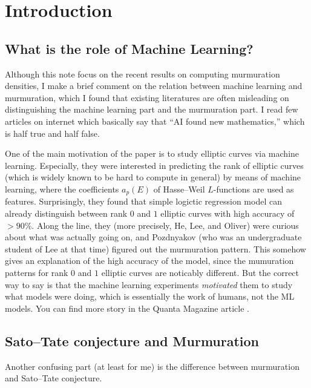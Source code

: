 \section{Introduction}
\label{sec:intro}

\subsection{What is the role of Machine Learning?}

Although this note focus on the recent results on computing murmuration densities, I make a brief comment on the relation between machine learning and murmuration, which I found that existing literatures are often misleading on distinguishing the machine learning part and the murmuration part.
I read few articles on internet which basically say that ``AI found new mathematics,'' which is half true and half false.

One of the main motivation of the paper \cite{he2024murmurations} is to study  elliptic curves via machine learning.
Especially, they were interested in predicting the rank of elliptic curves (which is widely known to be hard to compute in general) by means of machine learning, where the coefficients $a_p(E)$ of Hasse--Weil $L$-functions are used as features.
Surprisingly, they found that simple logictic regression model can already distinguish between rank $0$ and $1$ elliptic curves with high accuracy of $>90\%$.
Along the line, they (more precisely, He, Lee, and Oliver) were curious about what was actually going on, and Pozdnyakov (who was an undergraduate student of Lee at that time) figured out the murmuration pattern.
This somehow gives an explanation of the high accuracy of the model, since the mumuration patterns for rank $0$ and $1$ elliptic curves are noticably different.
But the correct way to say is that the machine learning experiments \emph{motivated} them to study what models were doing, which is essentially the work of humans, not the ML models.
You can find more story in the Quanta Magazine article \cite{chiou2024elliptic}.


\subsection{Sato--Tate conjecture and Murmuration}

Another confusing part (at least for me) is the difference between murmuration and Sato--Tate conjecture.